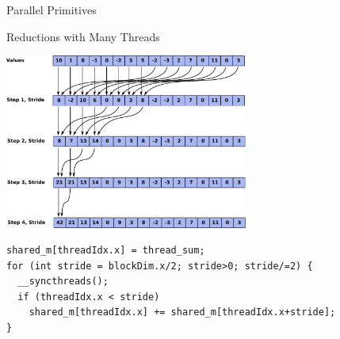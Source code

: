 \begin{frame}[fragile]{Parallel Primitives}

\begin{block}{Reductions with Many Threads}
\begin{center} 
  \includegraphics[width=0.6\textwidth]{figures/reduction}
\end{center}
\vspace*{-0.5cm}
\end{block}
\begin{center}
\begin{lstlisting}
shared_m[threadIdx.x] = thread_sum;
for (int stride = blockDim.x/2; stride>0; stride/=2) {
  __syncthreads();
  if (threadIdx.x < stride)
    shared_m[threadIdx.x] += shared_m[threadIdx.x+stride];
}
\end{lstlisting}
\end{center}

\end{frame}









